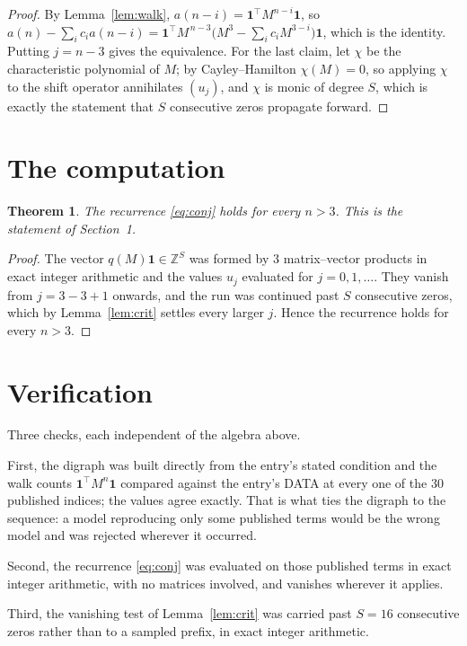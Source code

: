 \documentclass[11pt,a4paper]{article}
\theoremstyle{plain}
\newtheorem{theorem}{Theorem}
\theoremstyle{definition}
\begin{document}
\begin{proof}
By Lemma~\ref{lem:walk}, $a(n-i)=\mathbf{1}^{\!\top}M^{n-i}\mathbf{1}$, so
$a(n)-\sum_i c_i a(n-i)
=\mathbf{1}^{\!\top}M^{\,n-3}\bigl(M^{3}-\sum_i c_i M^{3-i}\bigr)
\mathbf{1}$, which is the identity. Putting $j=n-3$ gives the equivalence. For the
last claim, let $\chi$ be the characteristic polynomial of $M$; by Cayley--Hamilton
$\chi(M)=0$, so applying $\chi$ to the shift operator annihilates $(u_j)$, and $\chi$ is
monic of degree $S$, which is exactly the statement that $S$ consecutive zeros propagate
forward.
\end{proof}

\section{The computation}

\begin{theorem}
The recurrence \eqref{eq:conj} holds for every $n>3$. This is the statement of
Section~1.
\end{theorem}

\begin{proof}
The vector $q(M)\mathbf{1}\in\mathbb{Z}^{S}$ was formed by $3$ matrix--vector
products in exact integer arithmetic and the values $u_j$ evaluated for
$j=0,1,\dots$. They vanish from $j=3-3+1$ onwards, and the run was continued past
$S$ consecutive zeros, which by Lemma~\ref{lem:crit} settles every larger $j$. Hence the
recurrence holds for every $n>3$.
\end{proof}

\section{Verification}

Three checks, each independent of the algebra above.

First, the digraph was built directly from the entry's stated condition and the walk counts
$\mathbf{1}^{\!\top}M^{n}\mathbf{1}$ compared against the entry's DATA at every one of
the $30$ published indices; the values agree exactly. That is what ties the digraph to
the sequence: a model reproducing only some published terms would be the wrong model and
was rejected wherever it occurred.

Second, the recurrence \eqref{eq:conj} was evaluated on those published terms in exact
integer arithmetic, with no matrices involved, and vanishes wherever it applies.

Third, the vanishing test of Lemma~\ref{lem:crit} was carried past $S=16$ consecutive
zeros rather than to a sampled prefix, in exact integer arithmetic.
\end{document}
